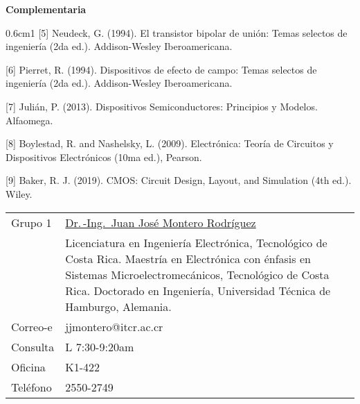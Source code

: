 \documentclass[11pt,oneside,letterpaper]{article}
\begin{document}
\textbf{Complementaria}

\begin{hangparas}{0.6cm}{1}
[5] Neudeck, G. (1994). El transistor bipolar de unión: Temas selectos de ingeniería (2da ed.).  Addison-Wesley Iberoamericana.

[6] Pierret, R. (1994). Dispositivos de efecto de campo: Temas selectos de ingeniería (2da ed.).  Addison-Wesley Iberoamericana.

[7] Julián, P. (2013). Dispositivos Semiconductores: Principios y Modelos. Alfaomega.

[8] Boylestad, R. and Nashelsky, L. (2009). Electrónica: Teoría de Circuitos y Dispositivos Electrónicos (10ma ed.), Pearson.

[9] Baker, R. J. (2019). CMOS: Circuit Design, Layout, and Simulation (4th ed.). Wiley.
\end{hangparas}


\begin{tabular}{lp{106mm}}
  Grupo 1 & \underline{Dr.\,-Ing.\ Juan José Montero Rodríguez} \\[2mm]
  & Licenciatura en Ingeniería Electrónica, Tecnológico de Costa Rica. Maestría en Electrónica con énfasis en Sistemas Microelectromecánicos, Tecnológico de Costa Rica. Doctorado en Ingeniería, Universidad Técnica de Hamburgo, Alemania.\\
Correo-e & jjmontero@itcr.ac.cr    \\
Consulta & L 7:30-9:20am\\
Oficina  & K1-422 \\
Teléfono & 2550-2749 \\ 
\end{tabular}
\end{document}
